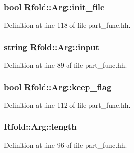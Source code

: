 \hypertarget{class_rfold_1_1_arg_a2cb4e22a01c0d933cc18dc2f48a05649}{
\subsubsection[{init\+\_\+file}]{\setlength{\rightskip}{0pt plus 5cm}bool Rfold\+::\+Arg\+::init\+\_\+file}}\label{class_rfold_1_1_arg_a2cb4e22a01c0d933cc18dc2f48a05649}


Definition at line 118 of file part\+\_\+func.\+hh.

\hypertarget{class_rfold_1_1_arg_a9844cbade756ff05f5c9592f17a63d95}{
\subsubsection[{input}]{\setlength{\rightskip}{0pt plus 5cm}string Rfold\+::\+Arg\+::input}}\label{class_rfold_1_1_arg_a9844cbade756ff05f5c9592f17a63d95}


Definition at line 89 of file part\+\_\+func.\+hh.

\hypertarget{class_rfold_1_1_arg_ab606ce2fd660a90d7af0f1d5773ffd57}{
\subsubsection[{keep\+\_\+flag}]{\setlength{\rightskip}{0pt plus 5cm}bool Rfold\+::\+Arg\+::keep\+\_\+flag}}\label{class_rfold_1_1_arg_ab606ce2fd660a90d7af0f1d5773ffd57}


Definition at line 112 of file part\+\_\+func.\+hh.

\hypertarget{class_rfold_1_1_arg_ae5c8053e399657b0c83bd10a904ac354}{
\subsubsection[{length}]{ Rfold\+::\+Arg\+::length}}\label{class_rfold_1_1_arg_ae5c8053e399657b0c83bd10a904ac354}


Definition at line 96 of file part\+\_\+func.\+hh.

